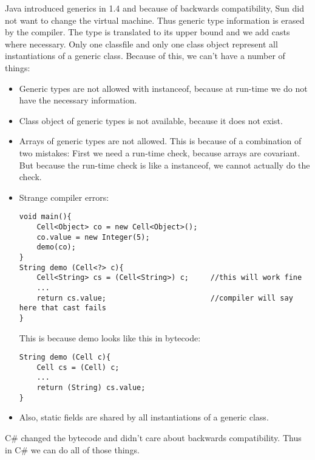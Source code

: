 \begin{mytitle} Java introduced generics in 1.4 and because of backwards compatibility, Sun did not want to change the virtual machine. Thus generic type information is erased by the compiler. The type is translated to its upper bound and we add casts where necessary. Only one classfile and only one class object represent all instantiations of a generic class. Because of this, we can't have a number of things:
\begin{itemize}
    \item Generic types are not allowed with instanceof, because at run-time we do not have the necessary information.
    \item Class object of generic types is not available, because it does not exist.
    \item Arrays of generic types are not allowed. This is because of a combination of two mistakes: First we need a run-time check, because arrays are covariant. But because the run-time check is like a instanceof, we cannot actually do the check.
    \item Strange compiler errors:
        \lstset{language = Java}
        \begin{lstlisting}
void main(){
    Cell<Object> co = new Cell<Object>();
    co.value = new Integer(5);
    demo(co);
}
String demo (Cell<?> c){
    Cell<String> cs = (Cell<String>) c;     //this will work fine
    ...
    return cs.value;                        //compiler will say here that cast fails
}
        \end{lstlisting}
    This is because demo looks like this in bytecode:
        \begin{lstlisting}
String demo (Cell c){
    Cell cs = (Cell) c;
    ...
    return (String) cs.value;
}
        \end{lstlisting}
    \item Also, static fields are shared by all instantiations of a generic class.
\end{itemize}
C\# changed the bytecode and didn't care about backwards compatibility. Thus in C\# we can do all of those things. 
\end{mytitle}
